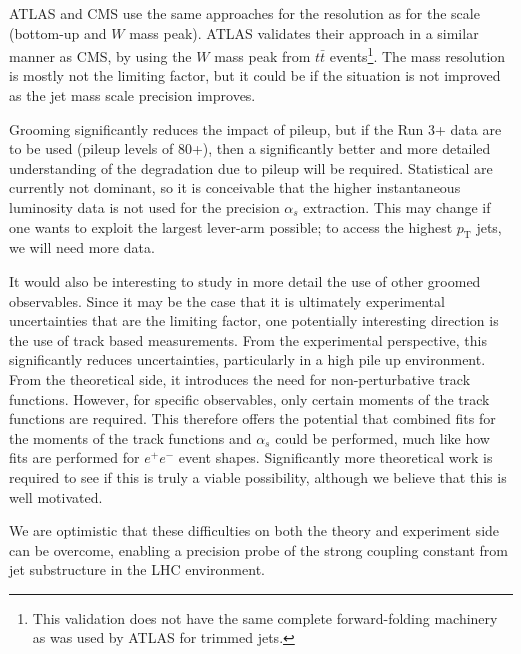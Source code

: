\documentclass[11pt,letterpaper]{article}
\begin{document}
\vspace{5mm}

 ATLAS and CMS use the same approaches for the resolution as for the scale (bottom-up and $W$ mass peak).  ATLAS validates their approach in a similar manner as CMS, by using the $W$ mass peak from $t\bar{t}$ events\footnote{This validation does not have the same complete forward-folding machinery as was used by ATLAS for trimmed jets.}.  The mass resolution is mostly not the limiting factor, but it could be if the situation is not improved as the jet mass scale precision improves. 

\vspace{5mm}

 Grooming significantly reduces the impact of pileup, but if the Run 3+ data are to be used (pileup levels of 80+), then a significantly better and more detailed understanding of the degradation due to pileup will be required.  Statistical are currently not dominant, so it is conceivable that the higher instantaneous luminosity data is not used for the precision $\alpha_s$ extraction.  This may change if one wants to exploit the largest lever-arm possible; to access the highest $p_\text{T}$ jets, we will need more data.

\vspace{5mm}

It would also be interesting to study in more detail the use of other groomed observables. Since it may be the case that it is ultimately experimental uncertainties that are the limiting factor, one potentially interesting direction is the use of track based measurements. From the experimental perspective, this significantly reduces uncertainties, particularly in a high pile up environment. From the theoretical side, it introduces the need for non-perturbative track functions. However, for specific observables, only certain moments of the track functions are required. This therefore offers the potential that combined fits for the moments of the track functions and $\alpha_s$ could be performed, much like how fits are performed for $e^+e^-$ event shapes. Significantly more theoretical work is required to see if this is truly a viable possibility, although we believe that this is well motivated.


We are optimistic that these difficulties on both the theory and experiment side can be overcome, enabling a precision probe of the strong coupling constant from jet substructure in the LHC environment.
\end{document}
